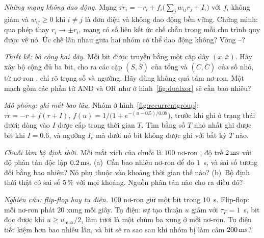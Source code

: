 \begin{exercise}[\lvlB]
\label{ex:02:3}
\emph{Những mạng không dao động.} Mạng $\tau\dot r_i=-r_i+f_i\bigl(\textstyle\sum_jw_{ij}r_j+I_i\bigr)$ với $f_i$ không giảm và $w_{ij}\ge0$ khi $i\ne j$ là đơn điệu và không dao động bền vững. Chứng minh: qua phép thay $r_i\to\pm r_i$, mạng có số liên kết ức chế chẵn trong mỗi chu trình quy được về nó. Ức chế lẫn nhau giữa hai nhóm có thể dao động không? Vòng --?
\end{exercise}

\begin{exercise}[\lvlB]
\label{ex:02:4}
\emph{Thiết kế: bộ cộng hai dây.} Mỗi bit được truyền bằng một cặp dây $(x,\bar x)$. Hãy xây bộ cộng đủ ba bit, cho ra các cặp $(S,\bar S)$ của tổng và $(C,\bar C)$ của số nhớ, từ nơ-ron , chỉ rõ trọng số và ngưỡng. Hãy dùng không quá tám nơ-ron. Một mạch gồm các phần tử AND và OR như ở hình~\ref{fig:dualxor} sẽ cần bao nhiêu?
\end{exercise}

\begin{exercise}[\lvlB]
\label{ex:02:5}
\emph{Mô phỏng: ghi mất bao lâu.} Nhóm ở hình~\ref{fig:recurrentgroup}: $\tau\dot r=-r+f(r+I)$, $f(u)=1/\bigl(1+e^{-(u-0.5)/0.08}\bigr)$, trước khi ghi ở trạng thái dưới; dòng vào $I$ được cấp trong thời gian $T$. Tìm bằng số $T$ nhỏ nhất ghi được bit khi $I=0.6$, và ngưỡng $I_c$ mà dưới nó bit không được ghi với bất kỳ $T$ nào.
\end{exercise}

\begin{exercise}[\lvlA]
\label{ex:02:6}
\emph{Chuỗi làm bộ định thời.} Mỗi mắt xích của chuỗi là $100$ nơ-ron , độ trễ $2\,\text{ms}$ với độ phân tán độc lập $0.2\,\text{ms}$. (a)~Cần bao nhiêu nơ-ron để đo $1$~s, và sai số tương đối bằng bao nhiêu? Nó phụ thuộc vào khoảng thời gian thế nào? (b)~Bộ định thời thật có sai số $5\,\%$ với mọi khoảng. Nguồn phân tán nào cho ra điều đó?
\end{exercise}

\begin{exercise}[\lvlC]
\label{ex:02:7}
\emph{Nghiên cứu: flip-flop hay tụ điện.} $100$ nơ-ron giữ một bit trong $10$~s. Flip-flop: mỗi nơ-ron phát $20$ xung mỗi giây. Tụ điện: sự tạo thuận $u$ giảm với $\tau_F=1$~s, bit đọc được khi $u\ge u_{\max}/2$, làm tươi là một chùm ba xung ở mỗi nơ-ron. Tụ điện tiết kiệm hơn bao nhiêu lần, và bit sẽ ra sao sau khi nhóm bị làm câm $200\,\text{ms}$?
\end{exercise}

